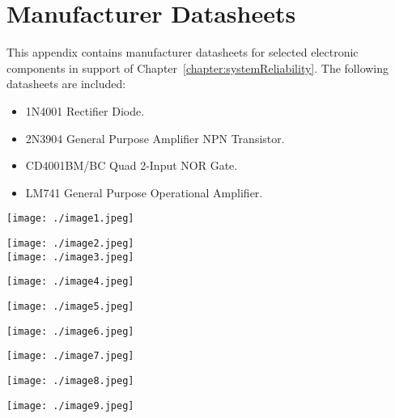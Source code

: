 \chapter{Manufacturer Datasheets}
\label{appendix:manfDatasheet}
\graphicspath{ {./appendixD/Fig} }

This appendix contains manufacturer datasheets for selected electronic
components in support of Chapter~\ref{chapter:systemReliability}. 
The following datasheets are included:

\begin{itemize}
\item   1N4001 Rectifier Diode.
\item  2N3904 General Purpose Amplifier NPN Transistor.
\item  CD4001BM/BC Quad 2-Input NOR Gate.
\item  LM741 General Purpose Operational Amplifier.
\end{itemize}
\pagebreak

  \texttt{[image: ./image1.jpeg]}
    
\texttt{[image: ./image2.jpeg]}\\

\texttt{[image: ./image3.jpeg]}

\texttt{[image: ./image4.jpeg]}

\texttt{[image: ./image5.jpeg]}

\texttt{[image: ./image6.jpeg]}

\texttt{[image: ./image7.jpeg]}

\texttt{[image: ./image8.jpeg]}

\texttt{[image: ./image9.jpeg]}
